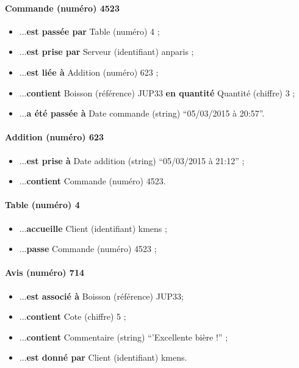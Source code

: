 \paragraph{Commande (numéro) 4523}
\begin{itemize}
	\item ...\textbf{est passée par} Table (numéro) 4 ;
	\item ...\textbf{est prise par} Serveur (identifiant) anparis ;
	\item ...\textbf{est liée à} Addition (numéro) 623 ;
	\item ...\textbf{contient} Boisson (référence) JUP33 \textbf{en quantité}
	Quantité (chiffre) 3 ;		
	\item ...\textbf{a été passée à} Date commande (string) ``05/03/2015 à 20:57''.
\end{itemize}

\paragraph{Addition (numéro) 623}
\begin{itemize}
	\item ...\textbf{est prise à} Date addition (string) ``05/03/2015 à 21:12'' ;
	\item ...\textbf{contient} Commande (numéro) 4523.
\end{itemize}

\paragraph{Table (numéro) 4}
\begin{itemize}
	\item ...\textbf{accueille} Client (identifiant) kmens ;
	\item ...\textbf{passe} Commande (numéro) 4523 ;
\end{itemize}

\paragraph{Avis (numéro) 714}
\begin{itemize}
	\item ...\textbf{est associé à} Boisson (référence) JUP33;
	\item ...\textbf{contient} Cote (chiffre) 5 ;
	\item ...\textbf{contient} Commentaire (string) ``'Excellente bière !'' ;
	\item ...\textbf{est donné par} Client (identifiant) kmens.
\end{itemize}

